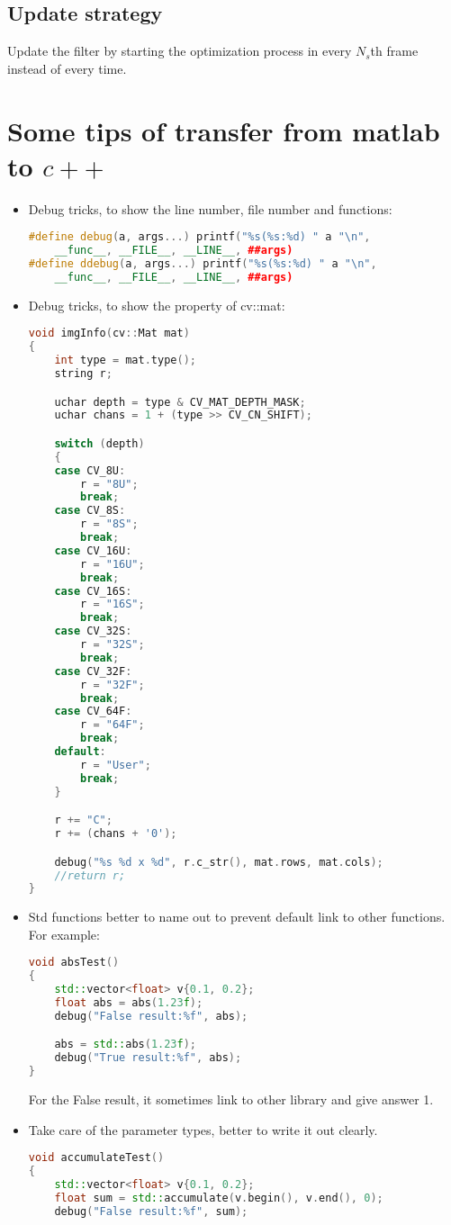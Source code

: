 \documentclass[12pt]{article}
\numberwithin{equation}{section}
\begin{document}
\subsection{Update strategy}
Update the filter by starting the optimization process in every $N_s$th frame instead of every time.
\section{Some tips of transfer from matlab to $c++$}
\begin{itemize}
	\item Debug tricks, to show the line number, file number and functions:
		\begin{lstlisting}[language=C++]
#define debug(a, args...) printf("%s(%s:%d) " a "\n", 
	__func__, __FILE__, __LINE__, ##args)
#define ddebug(a, args...) printf("%s(%s:%d) " a "\n", 
	__func__, __FILE__, __LINE__, ##args)
		\end{lstlisting}
	\item Debug tricks, to show the property of cv::mat:
		\begin{lstlisting}[language=C++]
void imgInfo(cv::Mat mat)
{
	int type = mat.type();
	string r;

	uchar depth = type & CV_MAT_DEPTH_MASK;
	uchar chans = 1 + (type >> CV_CN_SHIFT);

	switch (depth)
	{
	case CV_8U:
		r = "8U";
		break;
	case CV_8S:
		r = "8S";
		break;
	case CV_16U:
		r = "16U";
		break;
	case CV_16S:
		r = "16S";
		break;
	case CV_32S:
		r = "32S";
		break;
	case CV_32F:
		r = "32F";
		break;
	case CV_64F:
		r = "64F";
		break;
	default:
		r = "User";
		break;
	}

	r += "C";
	r += (chans + '0');

	debug("%s %d x %d", r.c_str(), mat.rows, mat.cols);
	//return r;
}
		\end{lstlisting}		
	\item Std functions better to name out to prevent default link to other functions. 
	For example: 
		\begin{lstlisting}[language=C++]
void absTest()
{
	std::vector<float> v{0.1, 0.2};
	float abs = abs(1.23f);
	debug("False result:%f", abs);

	abs = std::abs(1.23f);
	debug("True result:%f", abs);
}
		\end{lstlisting}
	For the False result, it sometimes link to other library and give answer 1.
	\item Take care of the parameter types, better to write it out clearly.
		\begin{lstlisting}[language=C++]
void accumulateTest()
{
	std::vector<float> v{0.1, 0.2};
	float sum = std::accumulate(v.begin(), v.end(), 0);
	debug("False result:%f", sum);


\end{lstlisting}
\end{itemize}
\end{document}
